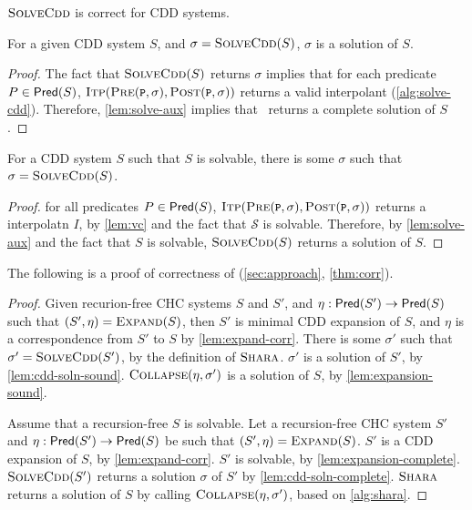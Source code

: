 $\textsc{SolveCdd}$ is correct for CDD systems.
%
\begin{lem}
  \label{lem:cdd-soln-sound}
  For a given CDD system $S$, and $\sigma = \textsc{SolveCdd}(S)$, %
  $\sigma$ is a solution of $S$.
\end{lem}
%
\begin{proof}
  The fact that $\textsc{SolveCdd}(S)$ returns $\sigma$ implies that for each
  predicate $P \in \mathsf{Pred}( S )$,
  $\solveitp(\prectr(\cc{P},\sigma),\postctr(\cc{P},\sigma))$ returns
  a valid interpolant (\autoref{alg:solve-cdd}).
  Therefore, \autoref{lem:solve-aux} implies that \solvecdd~returns a
  complete solution of $S$.
\end{proof}

\begin{lem}
  \label{lem:cdd-soln-complete}
  For a CDD system $S$ such that $S$ is
  solvable, %
  there is some $\sigma$ such that %
  $\sigma = \textsc{SolveCdd}(S)$.
\end{lem}
%
\begin{proof}
  for all predicates $P \in \mathsf{Pred}( S )$, $\solveitp(\prectr(\cc{P},\sigma),\postctr(\cc{P},\sigma))$ returns a interpolatn $I$, by
  \autoref{lem:vc} and the fact that $\mathcal{S}$ is solvable.
  Therefore, by \autoref{lem:solve-aux} and the fact that
  $S$ is solvable, $\textsc{SolveCdd}(S)$ returns a
  solution of $S$.
\end{proof}

The following is a proof of correctness of \sys
(\autoref{sec:approach}, \autoref{thm:corr}).
%
\begin{proof}
  Given recurion-free CHC systems $S$ and $S'$, and $\eta :\mathsf{Pred}( S' ) \to 
  \mathsf{Pred}( S )$ such that $(S', \eta) = \textsc{Expand}(S)$, 
  then $S'$ is minimal CDD expansion of 
  $S$, and $\eta$ is a correspondence from $S'$ to $S$ by \autoref{lem:expand-corr}.
  There is some $\sigma'$ such that
  $\sigma' = \textsc{SolveCdd}(S' )$, by
  the definition of $\textsc{Shara}$.
  $\sigma'$ is a solution of $S'$, by
  \autoref{lem:cdd-soln-sound}.
  $\textsc{Collapse}( \eta ,  \sigma' )$ is a solution of $S$, by
  \autoref{lem:expansion-sound}.

  Assume that a recursion-free $S$ is solvable.
  Let a recursion-free CHC system $S'$ and $\eta :
  \mathsf{Pred}( S' ) \to \mathsf{Pred}( S )$ be such that $(S',
  \eta) = \textsc{Expand}(S)$.
  $S'$ is a CDD expansion of $S$, by
  \autoref{lem:expand-corr}.
  $S'$ is solvable, by \autoref{lem:expansion-complete}.
  $\textsc{SolveCdd}(S')$ returns a solution $\sigma$ of $S'$ by \autoref{lem:cdd-soln-complete}.
  $\textsc{Shara}$ returns a solution of $S$ by calling $\textsc{Collapse}( \eta ,  \sigma' )$, based on
  \autoref{alg:shara}.
\end{proof}

